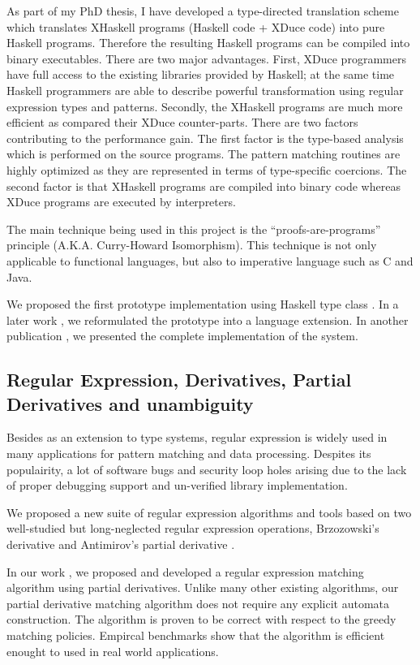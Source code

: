 \documentclass[12pt]{article}
\theoremstyle{plain} \numberwithin{equation}{section}
\theoremstyle{definition}
\begin{document}
As part of my PhD thesis, I have developed a
type-directed translation scheme which translates XHaskell programs
(Haskell code + XDuce code) into pure Haskell programs. Therefore
the resulting Haskell programs can be compiled into binary executables.
There are two major advantages. First, XDuce programmers have full
access to the existing libraries provided by Haskell; at the same
time Haskell programmers are able to describe powerful transformation
using regular expression types and patterns. Secondly, the XHaskell
programs are much more efficient as compared their XDuce counter-parts.
There are two factors contributing to the performance gain. 
The first factor is the type-based analysis which is performed on the 
source programs. The pattern matching routines are highly optimized
as they are represented in terms of type-specific coercions. The second 
factor is that XHaskell programs are compiled into binary code whereas
XDuce programs are executed by interpreters.

The main technique being used in this project is the
``proofs-are-programs'' principle (A.K.A. Curry-Howard Isomorphism). 
This technique is not only applicable to functional
languages, but also to imperative language such as C and Java.

We proposed the first prototype implementation using Haskell type class
 \cite{semantic-subtyping}. In a later work \cite{ml-workshop05}, 
we reformulated the prototype into a language extension. 
In another publication \cite{DBLP:conf/ifl/SulzmannL07}, we presented the complete implementation of the system.


\subsection{Regular Expression, Derivatives, Partial Derivatives and unambiguity}

Besides as an extension to type systems, regular expression is widely used in many
applications for pattern matching and data processing.
Despites its populairity, a lot of software bugs and security loop holes arising due to the
lack of proper debugging support and un-verified library implementation. 

We proposed a new suite of regular expression algorithms and tools based on two well-studied
but long-neglected regular expression operations,
Brzozowski's derivative \cite{321249} and Antimirov's partial derivative \cite{Antimirov96Partial}.

In our work \cite{DBLP:conf/ppdp/SulzmannL12}, we proposed and developed a regular expression
matching algorithm using partial derivatives. Unlike many other existing algorithms, our
partial derivative matching algorithm does not require any explicit automata construction.
The algorithm is proven to be correct with respect to the greedy matching policies. Empircal
benchmarks show that the algorithm is efficient enought to used in real world applications.
\end{document}
